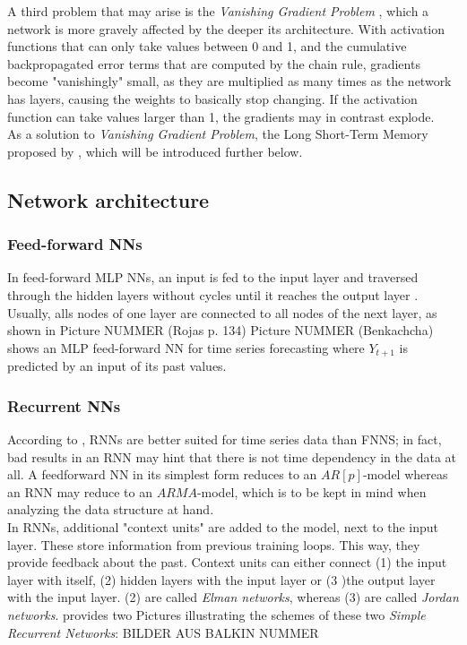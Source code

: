 \documentclass[a4paper, 11pt]{article}
\begin{document}
A third problem that may arise is the \textit{Vanishing Gradient Problem} \citep{Schmidhuber.2015}, which a network is more gravely affected by the deeper its architecture. With activation functions that can only take values between 0 and 1, and the cumulative backpropagated error terms that are computed by the chain rule, gradients become "vanishingly" small, as they are multiplied as many times as the network has layers, causing the weights to basically stop changing. If the activation function can take values larger than 1, the gradients may in contrast explode.\\
As a solution to \textit{Vanishing Gradient Problem}, the Long Short-Term Memory proposed by \cite{Hochreiter.1997}, which will be introduced further below.

\subsection{Network architecture}

\subsubsection{Feed-forward NNs}



In feed-forward MLP NNs, an input is fed to the input layer and traversed through the hidden layers without cycles until it reaches the output layer \citep{Rojas.1996}. Usually, alls nodes of one layer are connected to all nodes of the next layer, as shown in Picture NUMMER (Rojas p. 134)
Picture NUMMER (Benkachcha) shows an MLP feed-forward NN for time series forecasting where $Y_{t+1}$ is predicted by an input of its past values.\\


\subsubsection{Recurrent NNs}

According to \cite{Balkin.1997}, RNNs are better suited for time series data than FNNS; in fact, bad results in an RNN may hint that there is not time dependency in the data at all. 
A feedforward NN in its simplest form reduces to an $AR[p]$-model whereas an RNN may reduce to an $ARMA$-model, which is to be kept in mind when analyzing the data structure at hand.\\
In RNNs, additional "context units" are added to the model, next to the input layer. These store information from previous training loops. This way, they provide feedback about the past. Context units can either connect (1) the input layer with itself, (2) hidden layers with the input layer or (3 )the output layer with the input layer. (2) are called \textit{Elman networks}, whereas (3) are called \textit{Jordan networks}.
\cite{Balkin.1997} provides two Pictures illustrating the schemes of these two \textit{Simple Recurrent Networks}:
BILDER AUS BALKIN NUMMER
\end{document}
